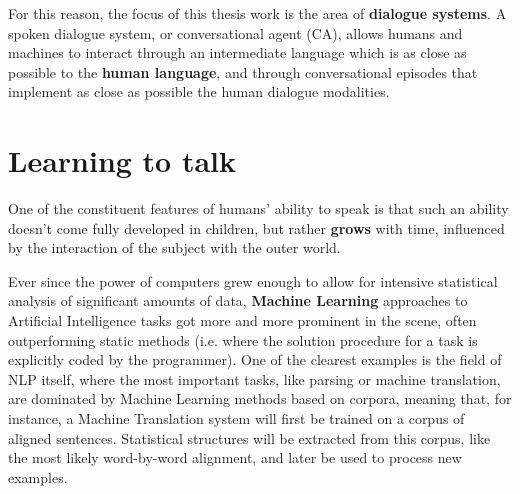For this reason, the focus of this thesis work is the area of \textbf{dialogue systems}. A spoken dialogue system, or conversational agent (CA), allows humans and machines to interact through an intermediate language which is as close as possible to the \textbf{human language}, and through conversational episodes that implement as close as possible the human dialogue modalities.


\section{Learning to talk}

One of the constituent features of humans' ability to speak is that such an ability doesn't come fully developed in children, but rather \textbf{grows} with time, influenced by the interaction of the subject with the outer world.

Ever since the power of computers grew enough to allow for intensive statistical analysis of significant amounts of data, \textbf{Machine Learning} approaches to Artificial Intelligence tasks got more and more prominent in the scene, often outperforming static methods (i.e. where the solution procedure for a task is explicitly coded by the programmer).
One of the clearest examples is the field of NLP itself, where the most important tasks, like parsing or machine translation, are dominated by Machine Learning methods based on corpora,
meaning that, for instance, a Machine Translation system will first be trained on a corpus of aligned sentences. Statistical structures will be extracted from this corpus, like the most likely word-by-word alignment, and later be used to process new examples.

